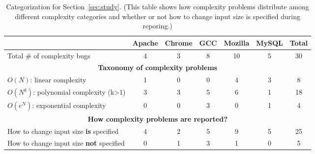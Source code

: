 \begin{table*}[tb!]
\begin{adjustwidth}{-.5in}{-.5in}
\small
\centering
{
\begin{tabular}{|lcccccc|}
\hline
                                                               &   Apache  &   Chrome   &  GCC   &    Mozilla   &   MySQL  &  Total\\
\hline
Total \# of complexity bugs                                          &   4       &    3       &   8    &    10        &   5      &   30 \\
\hline
\multicolumn{7}{|c|}{\bf Taxonomy of complexity problems}\\
\multicolumn{1}{|l}{{\bf $O(N)$}: linear complexity}                 &   1       &    0       &   0    &    4         &   3      &   8\\
\multicolumn{1}{|l}{{\bf $O(N^k)$}: polynomial complexity (k>1)}     &   3       &    3       &   5    &    6         &   1      &  18\\
\multicolumn{1}{|l}{{\bf $O(e^N)$}: exponential complexity}          &   0       &    0       &   3    &    0         &   1      &   4\\
\hline
\multicolumn{7}{|c|}{\bf How complexity problems are reported?}\\
\multicolumn{1}{|l}{How to change input size {\bf is} specified}     &  4&2&5&9&5&25\\
\multicolumn{1}{|l}{How to change input size {\bf not} specified}    &  0&1&3&1&0&5\\
\hline
\end{tabular}
}
\end{adjustwidth}
\caption{Categorization for Section~\ref{sec:study}.
(This table shows how complexity problems distribute among different complexity categories 
 and whether or not how to change input size is specified during reporing.)}
\label{tab:study}
\end{table*}
